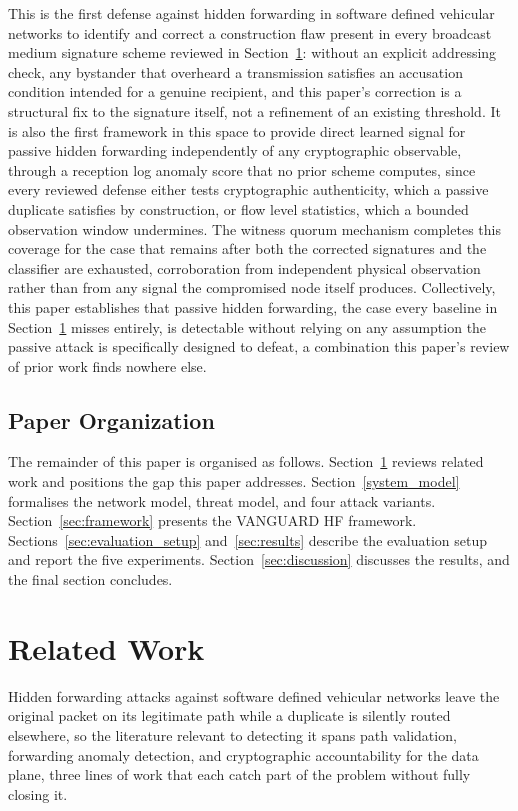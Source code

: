 \documentclass[final,5p,twocolumn]{elsarticle}
\theoremstyle{remark}
\theoremstyle{plain}
\begin{document}
This is the first defense against hidden forwarding in software defined
vehicular networks to identify and correct a construction flaw present in
every broadcast medium signature scheme reviewed in
Section~\ref{sec:related}: without an explicit addressing check, any
bystander that overheard a transmission satisfies an accusation condition
intended for a genuine recipient, and this paper's correction is a
structural fix to the signature itself, not a refinement of an existing
threshold. It is also the first framework in this space to provide direct
learned signal for passive hidden forwarding independently of any
cryptographic observable, through a reception log anomaly score that no
prior scheme computes, since every reviewed defense either tests
cryptographic authenticity, which a passive duplicate satisfies by
construction, or flow level statistics, which a bounded observation
window undermines. The witness quorum mechanism completes this coverage
for the case that remains after both the corrected signatures and the
classifier are exhausted, corroboration from independent physical
observation rather than from any signal the compromised node itself
produces. Collectively, this paper establishes that passive hidden
forwarding, the case every baseline in Section~\ref{sec:related} misses
entirely, is detectable without relying on any assumption the passive
attack is specifically designed to defeat, a combination this paper's
review of prior work finds nowhere else.

\subsection{Paper Organization}

The remainder of this paper is organised as follows. Section~\ref{sec:related}
reviews related work and positions the gap this paper addresses.
Section~\ref{system_model} formalises the network model, threat model,
and four attack variants. Section~\ref{sec:framework} presents the
VANGUARD HF framework. Sections~\ref{sec:evaluation_setup}
and~\ref{sec:results} describe the evaluation setup and report the five
experiments. Section~\ref{sec:discussion} discusses the results, and the
final section concludes.


\section{Related Work}
\label{sec:related}

Hidden forwarding attacks against software defined vehicular networks leave
the original packet on its legitimate path while a duplicate is silently
routed elsewhere, so the literature relevant to detecting it spans path
validation, forwarding anomaly detection, and cryptographic accountability
for the data plane, three lines of work that each catch part of the problem
without fully closing it.
\end{document}
